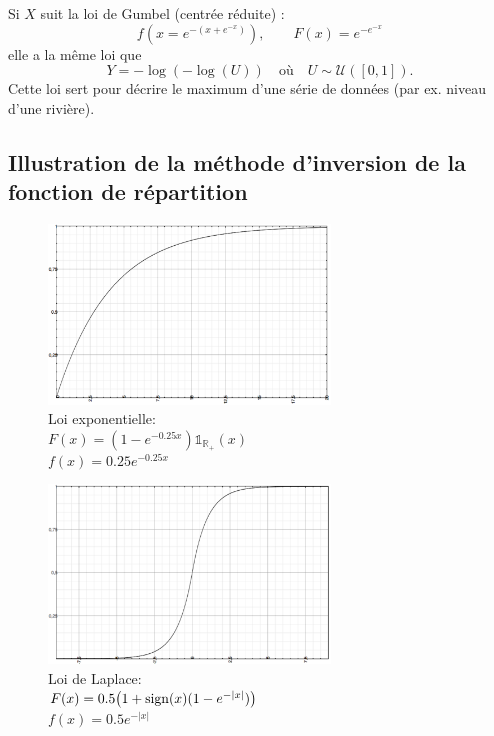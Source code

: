 {\textbullet Si $X$ suit la loi de Gumbel (centrée réduite) :
$$f(x=e^{-(x+e^{-x})}), \quad\mathrm{     }\quad F(x)=e^{-e^{-x}}$$ elle a la même loi que
$$Y=-\log(-\log(U))\quad\mathrm{   \text{où}  }\quad U\sim\mathcal{U}([0,1]).$$
Cette loi sert pour décrire le maximum d’une série de données
(par ex. niveau d’une rivière).

\subsection{Illustration de la méthode d'inversion de la fonction de répartition}



\begin{figure}[h]
\centering
\includegraphics[width=7.5cm]{content/foncrepexp.PNG}
\caption{Loi exponentielle:\\$F(x)=(1-e^{-0.25x})\mathds{1}_{\mathbb{R}_{+}}(x)$\\$f(x)=0.25e^{-0.25x}$ }
\end{figure}


\begin{figure}[h]
\centering
\includegraphics[width=7.5cm]{content/lap.PNG}
\caption{Loi de Laplace:\\$F(x)=0.5\big(1+\operatorname{sign}(x)(1-e^{-|x|})\big)$\\$f(x)=0.5e^{-|x|}$ }
\end{figure}

}
